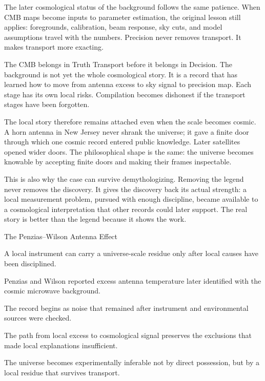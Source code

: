 The later cosmological status of the background follows the same
patience. When CMB maps become inputs to parameter estimation, the
original lesson still applies: foregrounds, calibration, beam response,
sky cuts, and model assumptions travel with the numbers. Precision never
removes transport. It makes transport more exacting.

The CMB belongs in Truth Transport before it belongs in Decision. The
background is not yet the whole cosmological story. It is a record that
has learned how to move from antenna excess to sky signal to precision
map. Each stage has its own local risks. Compilation becomes dishonest if the
transport stages have been forgotten.

The local story therefore remains attached even when the scale becomes
cosmic. A horn antenna in New Jersey never shrank the universe; it gave
a finite door through which one cosmic record entered public knowledge.
Later satellites opened wider doors. The philosophical shape is the same:
the universe becomes knowable by accepting finite doors and making their
frames inspectable.

This is also why the case can survive demythologizing. Removing the
legend never removes the discovery. It gives the discovery back its
actual strength: a local measurement problem, pursued with enough
discipline, became available to a cosmological interpretation that other
records could later support. The real story is better than the legend
because it shows the work.

\begin{phenom}{The Penzias--Wilson Antenna Effect~\cite{penzias1965}}
\label{ph:penzias-wilson-antenna}

\PhStatement
A local instrument can carry a universe-scale residue only after local causes
have been disciplined.

\PhOrigin
Penzias and Wilson reported excess antenna temperature later identified with
the cosmic microwave background.

\PhObservation
The record begins as noise that remained after instrument and environmental
sources were checked.

\PhConstraint
The path from local excess to cosmological signal preserves the exclusions
that made local explanations insufficient.

\PhConsequence
The universe becomes experimentally inferable not by direct possession, but by
a local residue that survives transport.
\end{phenom}

